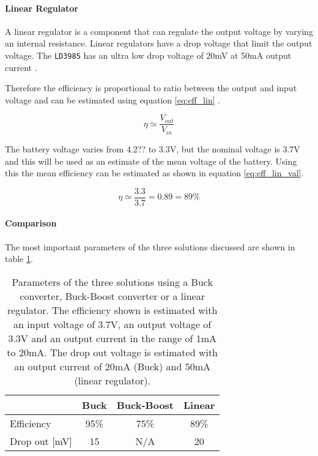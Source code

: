 \paragraph{Linear Regulator}
A linear regulator is a component that can regulate the output voltage by varying an internal resistance.
Linear regulators have a drop voltage that limit the output voltage. 
The \texttt{LD3985} has an ultra low drop voltage of 20mV at 50mA output current \cite{LD3985}.

Therefore the efficiency is proportional to ratio between the output and input voltage and can be estimated using equation \ref{eq:eff_lin} \cite{ap_note_140}.

\begin{equation}
	\eta \simeq \frac{V_{out}}{V_{in}}
	\label{eq:eff_lin}
\end{equation}

The battery voltage varies from 4.2?? to 3.3V, but the nominal voltage is 3.7V and this will be used as an estimate of the mean voltage of the battery.
Using this the mean efficiency can be estimated as shown in equation \ref{eq:eff_lin_val}.

\begin{equation}
	\eta \simeq \frac{3.3}{3.7} = 0.89 = 89\%
	\label{eq:eff_lin_val}
\end{equation}


\paragraph{Comparison}
The most important parameters of the three solutions discussed are shown in table \ref{tab:vol_gen_joint}.

\begin{table}[h]
	\centering
	\begin{tabular}{l|c|c|c}
		  				&	Buck 	& Buck-Boost 	& Linear\\
		 \hline
		 Efficiency  	&  95\% 	& 75\%			&89\%		\\
		 Drop out [mV]		&15  	& N/A		&20		\\
	\end{tabular}
	\caption[Parameters of voltage generation solutions.]{Parameters of the three solutions using a Buck converter, Buck-Boost converter or a linear regulator. The efficiency shown is estimated with an input voltage of 3.7V, an output voltage of 3.3V and an output current in the range of 1mA to 20mA. The drop out voltage is estimated with an output current of 20mA (Buck) and 50mA (linear regulator).}
	\label{tab:vol_gen_joint}
\end{table}

